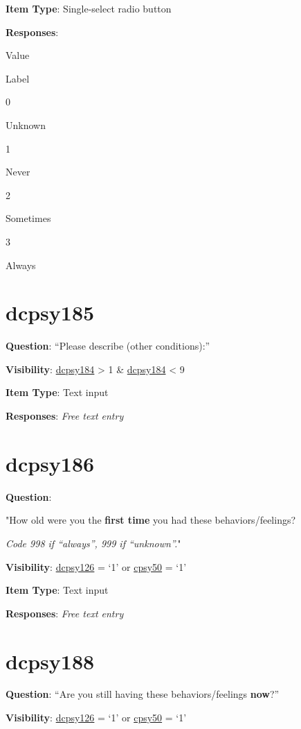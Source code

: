 \documentclass[]{book}
\begin{document}
\textbf{Item Type}: Single-select radio button

\textbf{Responses}:

Value

Label

0

Unknown

1

Never

2

Sometimes

3

Always

\hypertarget{dcpsy185}{%
\section{dcpsy185}\label{dcpsy185}}

\textbf{Question}: ``Please describe (other conditions):''

\textbf{Visibility}: \protect\hyperlink{dcpsy184}{dcpsy184} \textgreater{} 1 \& \protect\hyperlink{dcpsy184}{dcpsy184} \textless{} 9

\textbf{Item Type}: Text input

\textbf{Responses}: \emph{Free text entry}

\hypertarget{dcpsy186}{%
\section{dcpsy186}\label{dcpsy186}}

\textbf{Question}:

"How old were you the \textbf{first time} you had these behaviors/feelings?

\emph{Code 998 if ``always'', 999 if ``unknown''.}"

\textbf{Visibility}: \protect\hyperlink{dcpsy126}{dcpsy126} = `1' or \protect\hyperlink{cpsy50}{cpsy50} = `1'

\textbf{Item Type}: Text input

\textbf{Responses}: \emph{Free text entry}

\hypertarget{dcpsy188}{%
\section{dcpsy188}\label{dcpsy188}}

\textbf{Question}: ``Are you still having these behaviors/feelings \textbf{now}?''

\textbf{Visibility}: \protect\hyperlink{dcpsy126}{dcpsy126} = `1' or \protect\hyperlink{cpsy50}{cpsy50} = `1'
\end{document}

